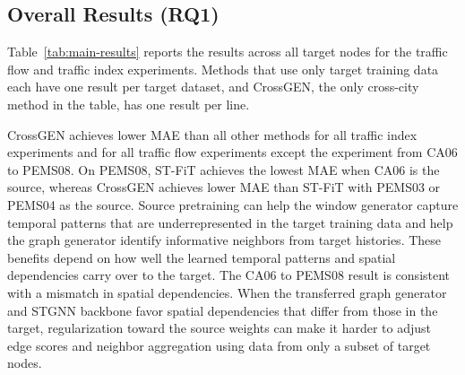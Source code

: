 \documentclass[runningheads,a4paper]{llncs}
\begin{document}
\subsection{Overall Results (RQ1)}
\label{sec:overall-results}









Table~\ref{tab:main-results} reports the results across all target nodes for the traffic flow and traffic index experiments. Methods that use only target training data each have one result per target dataset, and CrossGEN, the only cross-city method in the table, has one result per line.

CrossGEN achieves lower MAE than all other methods for all traffic index experiments and for all traffic flow experiments except the experiment from CA06 to PEMS08. On PEMS08, ST-FiT achieves the lowest MAE when CA06 is the source, whereas CrossGEN achieves lower MAE than ST-FiT with PEMS03 or PEMS04 as the source. Source pretraining can help the window generator capture temporal patterns that are underrepresented in the target training data and help the graph generator identify informative neighbors from target histories. These benefits depend on how well the learned temporal patterns and spatial dependencies carry over to the target. The CA06 to PEMS08 result is consistent with a mismatch in spatial dependencies. When the transferred graph generator and STGNN backbone favor spatial dependencies that differ from those in the target, regularization toward the source weights can make it harder to adjust edge scores and neighbor aggregation using data from only a subset of target nodes.
\end{document}
